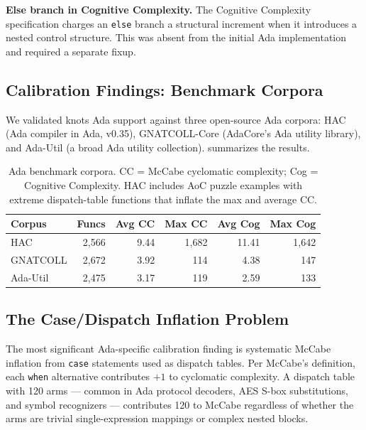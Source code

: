 \documentclass[10pt,twocolumn,letterpaper]{article}
\begin{document}
\textbf{Else branch in Cognitive Complexity.}  The Cognitive Complexity
specification charges an \texttt{else} branch a structural increment when
it introduces a nested control structure.  This was absent from the initial
Ada implementation and required a separate fixup.

\subsection{Calibration Findings: Benchmark Corpora}

We validated knots Ada support against three open-source Ada corpora:
HAC (Ada compiler in Ada, v0.35), GNATCOLL-Core (AdaCore's Ada utility
library), and Ada-Util (a broad Ada utility collection).
 summarizes the results.

\begin{table}[t]
\centering
\footnotesize
\begin{tabular}{@{}lrrrrr@{}}
\toprule
\textbf{Corpus} & \textbf{Funcs} & \textbf{Avg CC} & \textbf{Max CC} & \textbf{Avg Cog} & \textbf{Max Cog} \\
\midrule
HAC          & 2{,}566 & 9.44  & 1{,}682 & 11.41 & 1{,}642 \\
GNATCOLL     & 2{,}672 & 3.92  &   114   &  4.38 &   147   \\
Ada-Util     & 2{,}475 & 3.17  &   119   &  2.59 &   133   \\
\bottomrule
\end{tabular}
\caption{Ada benchmark corpora.  CC = McCabe cyclomatic complexity;
Cog = Cognitive Complexity.  HAC includes AoC puzzle examples with
extreme dispatch-table functions that inflate the max and average CC.}
\label{tab:ada-benchmarks}
\end{table}

\subsection{The Case/Dispatch Inflation Problem}

The most significant Ada-specific calibration finding is systematic
McCabe inflation from \texttt{case} statements used as dispatch tables.
Per McCabe's definition, each \texttt{when} alternative contributes $+1$
to cyclomatic complexity.  A dispatch table with 120 arms --- common in
Ada protocol decoders, AES S-box substitutions, and symbol recognizers
--- contributes 120 to McCabe regardless of whether the arms are trivial
single-expression mappings or complex nested blocks.
\end{document}
